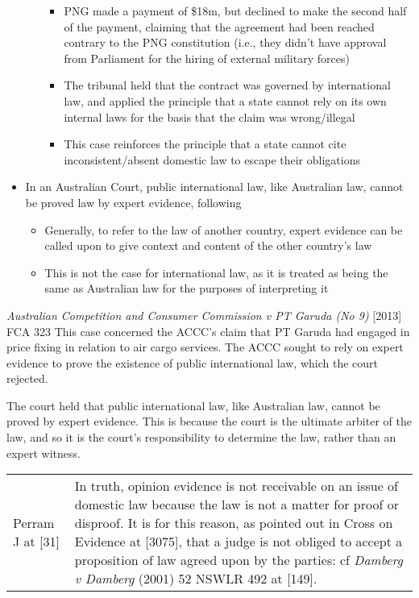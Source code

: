 \begin{itemize}
\begin{itemize}
\begin{itemize}
            \item PNG made a payment of \$18m, but declined to make the second half of the payment, claiming that the agreement had been reached contrary to the PNG constitution (i.e., they didn't have approval from Parliament for the hiring of external military forces)
            \item The tribunal held that the contract was governed by international law, and applied the principle that a state cannot rely on its own internal laws for the basis that the claim was wrong/illegal
            \item This case reinforces the principle that a state cannot cite inconsistent/absent domestic law to escape their obligations
        \end{itemize}
    \end{itemize}
    \item In an Australian Court, public international law, like Australian law, cannot be proved law by expert evidence, following 
    \begin{itemize}
        \item Generally, to refer to the law of another country, expert evidence can be called upon to give context and content of the other country's law
        \item This is not the case for international law, as it is treated as being the same as Australian law for the purposes of interpreting it
    \end{itemize}
\end{itemize}

\begin{casedetails}{\textit{Australian Competition and Consumer Commission v PT Garuda (No 9)} [2013] FCA 323}\label{case:ACCC v Garuda}
    \flushleft
    This case concerned the ACCC's claim that PT Garuda had engaged in price fixing in relation to air cargo services. The ACCC sought to rely on expert evidence to prove the existence of public international law, which the court rejected.

    \vspace{\baselineskip}

    The court held that public international law, like Australian law, cannot be proved by expert evidence. This is because the court is the ultimate arbiter of the law, and so it is the court's responsibility to determine the law, rather than an expert witness.

    \begin{longtable}{p{}|>{\raggedright\arraybackslash}p{}}
        Perram J at [31] & In truth, opinion evidence is not receivable on an issue of domestic law because the law is not a matter for proof or disproof. It is for this reason, as pointed out in Cross on Evidence at [3075], that a judge is not obliged to accept a proposition of law agreed upon by the parties: cf \textit{Damberg v Damberg} (2001) 52 NSWLR 492 at [149].
    \end{longtable}  
\end{casedetails}

